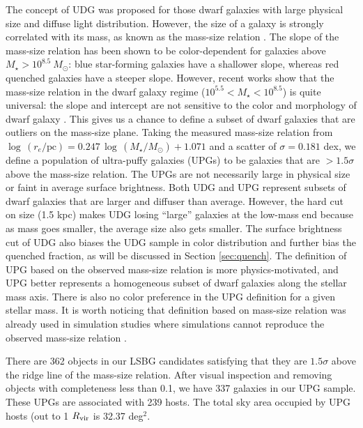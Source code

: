 \documentclass[twocolumn,astrosymb,twocolappendix]{aastex631}
\begin{document}
\begin{CJK*}{UTF8}{gbsn}
\vspace{1em}

The concept of UDG was proposed for those dwarf galaxies with large physical size and diffuse light distribution. However, the size of a galaxy is strongly correlated with its mass, as known as the mass-size relation \citep[e.g.,][]{Lange2015}. The slope of the mass-size relation has been shown to be color-dependent for galaxies above $M_\star > 10^{8.5}\ M_\odot$: blue star-forming galaxies have a shallower slope, whereas red quenched galaxies have a steeper slope. However, recent works show that the mass-size relation in the dwarf galaxy regime ($10^{5.5} < M_\star < 10^{8.5}$) is quite universal: the slope and intercept are not sensitive to the color and morphology of dwarf galaxy \citep{ELVES-I}. This gives us a chance to define a subset of dwarf galaxies that are outliers on the mass-size plane. Taking the measured mass-size relation from \citet{ELVES-I} $\log\, (r_e/\mathrm{pc}) = 0.247\, \log\, (M_\star/M_\odot) + 1.071$ and a scatter of $\sigma=0.181$ dex, we define a population of ultra-puffy galaxies (UPGs) to be galaxies that are $>1.5\sigma$ above the mass-size relation. The UPGs are not necessarily large in physical size or faint in average surface brightness. Both UDG and UPG represent subsets of dwarf galaxies that are larger and diffuser than average. However, the hard cut on size (1.5 kpc) makes UDG losing ``large'' galaxies at the low-mass end because as mass goes smaller, the average size also gets smaller. The surface brightness cut of UDG also biases the UDG sample in color distribution and further bias the quenched fraction, as will be discussed in Section \ref{sec:quench}. The definition of UPG based on the observed mass-size relation is more physics-motivated, and UPG better represents a homogeneous subset of dwarf galaxies along the stellar mass axis. There is also no color preference in the UPG definition for a given stellar mass. It is worth noticing that definition based on mass-size relation was already used in simulation studies where simulations cannot reproduce the observed mass-size relation \citep[e.g.,][]{Benavides2021}.

There are 362 objects in our LSBG candidates satisfying that they are $1.5\sigma$ above the ridge line of the mass-size relation. After visual inspection and removing objects with completeness less than 0.1, we have 337 galaxies in our UPG sample. These UPGs are associated with 239 hosts. The total sky area occupied by UPG hosts (out to 1 $R_{\rm{vir}}$ is 32.37 deg$^{2}$.



\end{CJK*}
\end{document}
